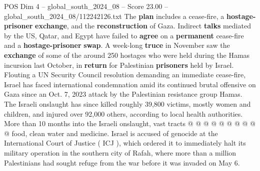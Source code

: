 \begin{textsample}{POS Dim 4 – global\_south\_2024\_08 – Score 23.00 – global\_south\_2024\_08/112242126.txt}
The \textbf{plan} includes a cease-fire, a \textbf{hostage-prisoner} \textbf{exchange}, and the \textbf{reconstruction} of Gaza.
Indirect \textbf{talks} mediated by the US, Qatar, and Egypt have failed to \textbf{agree} on a \textbf{permanent} cease-fire and a \textbf{hostage-prisoner} \textbf{swap}.
A week-long \textbf{truce} in November saw the \textbf{exchange} of some of the around 250 hostages who were held during the Hamas incursion last October, in \textbf{return} for Palestinian \textbf{prisoners} held by Israel.
Flouting a UN Security Council resolution demanding an immediate cease-fire, Israel has faced international condemnation amid its continued brutal offensive on Gaza since an Oct. 7, 2023 attack by the Palestinian resistance group Hamas.
The Israeli onslaught has since killed roughly 39,800 victims, mostly women and children, and injured over 92,000 others, according to local health authorities.
More than 10 months into the Israeli onslaught, vast tracts @ @ @ @ @ @ @ @ @ @ food, clean water and medicine.
Israel is accused of genocide at the International Court of Justice ( ICJ ), which ordered it to immediately halt its military operation in the southern city of Rafah, where more than a million Palestinians had sought refuge from the war before it was invaded on May 6.

\end{textsample}
